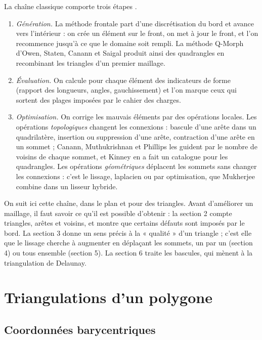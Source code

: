 \documentclass[11pt,a4paper]{article}
\theoremstyle{plain}
\theoremstyle{definition}
\theoremstyle{remark}
\begin{document}
La chaîne classique comporte trois étapes \cite{freygeorge}.
\begin{enumerate}[nosep]
\item \emph{Génération.} La méthode frontale part d'une discrétisation du bord et avance vers l'intérieur : on crée un élément sur le front, on met à jour le front, et l'on recommence jusqu'à ce que le domaine soit rempli. La méthode Q-Morph d'Owen, Staten, Canann et Saigal \cite{qmorph} produit ainsi des quadrangles en recombinant les triangles d'un premier maillage.
\item \emph{Évaluation.} On calcule pour chaque élément des indicateurs de forme (rapport des longueurs, angles, gauchissement) et l'on marque ceux qui sortent des plages imposées par le cahier des charges.
\item \emph{Optimisation.} On corrige les mauvais éléments par des opérations locales. Les opérations \emph{topologiques} changent les connexions : bascule d'une arête dans un quadrilatère, insertion ou suppression d'une arête, contraction d'une arête en un sommet ; Canann, Muthukrishnan et Phillips \cite{canann} les guident par le nombre de voisins de chaque sommet, et Kinney \cite{kinney} en a fait un catalogue pour les quadrangles. Les opérations \emph{géométriques} déplacent les sommets sans changer les connexions : c'est le lissage, laplacien ou par optimisation, que Mukherjee \cite{mukherjee} combine dans un lisseur hybride.
\end{enumerate}

On suit ici cette chaîne, dans le plan et pour des triangles. Avant d'améliorer un maillage, il faut savoir ce qu'il est possible d'obtenir : la section 2 compte triangles, arêtes et voisins, et montre que certains défauts sont imposés par le bord. La section 3 donne un sens précis à la « qualité » d'un triangle ; c'est elle que le lissage cherche à augmenter en déplaçant les sommets, un par un (section 4) ou tous ensemble (section 5). La section 6 traite les bascules, qui mènent à la triangulation de Delaunay.

\section{Triangulations d'un polygone}

\subsection{Coordonnées barycentriques}
\end{document}
